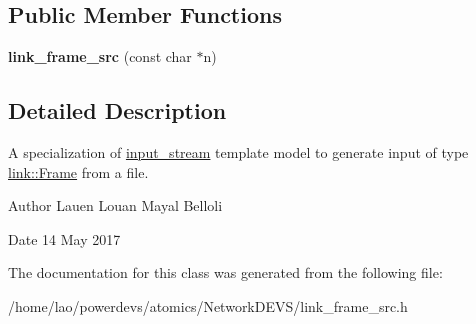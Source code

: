 \subsection*{Public Member Functions}
\begin{DoxyCompactItemize}
\item 
{\bfseries link\+\_\+frame\+\_\+src} (const char $\ast$n)\hypertarget{classlink__frame__src_a00b6c188c3a83d67f80bcf1a227c230c}{}\label{classlink__frame__src_a00b6c188c3a83d67f80bcf1a227c230c}

\end{DoxyCompactItemize}


\subsection{Detailed Description}
A specialization of \hyperlink{classinput__stream}{input\+\_\+stream} template model to generate input of type \hyperlink{structlink_1_1Frame}{link\+::\+Frame} from a file. 

\begin{DoxyAuthor}{Author}
Lauen Louan Mayal Belloli 
\end{DoxyAuthor}
\begin{DoxyDate}{Date}
14 May 2017 
\end{DoxyDate}


The documentation for this class was generated from the following file\+:\begin{DoxyCompactItemize}
\item 
/home/lao/powerdevs/atomics/\+Network\+D\+E\+V\+S/link\+\_\+frame\+\_\+src.\+h\end{DoxyCompactItemize}
